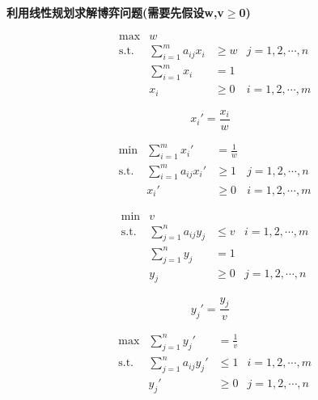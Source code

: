 \documentclass[12pt, a4paper, oneside, UTF8]{ctexbook}
\begin{document}
\begin{remark}
    \textbf{利用线性规划求解博弈问题(需要先假设w,v$\ge$0)}
\end{remark}

\begin{equation}
        \begin{aligned}
        & \text{max} & w \\
        & \text{s.t.} & \sum_{i=1}^{m} a_{ij} x_i & \geq w & j = 1, 2, \cdots, n \\
        & & \sum_{i=1}^{m} x_i & = 1 \\
        & & x_i & \geq 0 & i = 1, 2, \cdots, m
        \end{aligned}
        \end{equation}
        
        \begin{equation}
        x_i' = \frac{x_i}{w}
        \end{equation}
        
        \begin{equation}
        \begin{aligned}
        & \text{min} & \sum_{i=1}^{m} x_i' & = \frac{1}{w} \\
        & \text{s.t.} & \sum_{i=1}^{m} a_{ij} x_i' & \geq 1 & j = 1, 2, \cdots, n \\
        & & x_i' & \geq 0 & i = 1, 2, \cdots, m
        \end{aligned}
        \end{equation}
        
        \begin{equation}
        \begin{aligned}
        & \text{min} & v \\
        & \text{s.t.} & \sum_{j=1}^{n} a_{ij} y_j & \leq v & i = 1, 2, \cdots, m \\
        & & \sum_{j=1}^{n} y_j & = 1 \\
        & & y_j & \geq 0 & j = 1, 2, \cdots, n
        \end{aligned}
        \end{equation}
        
        \begin{equation}
        y_j' = \frac{y_j}{v}
        \end{equation}
        
        \begin{equation}
        \begin{aligned}
        & \text{max} & \sum_{j=1}^{n} y_j' & = \frac{1}{v} \\
        & \text{s.t.} & \sum_{j=1}^{n} a_{ij} y_j' & \leq 1 & i = 1, 2, \cdots, m \\
        & & y_j' & \geq 0 & j = 1, 2, \cdots, n
        \end{aligned}
\end{equation}
\end{document}
